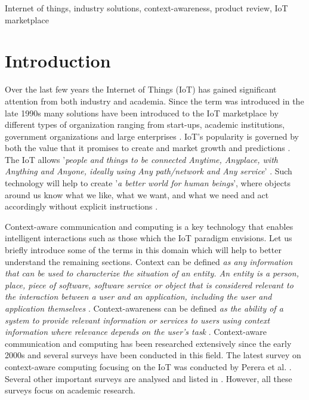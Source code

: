 \documentclass[journal]{IEEEtran}
\begin{document}
\begin{IEEEkeywords}
Internet of things, industry solutions, context-awareness, product review, IoT marketplace
\end{IEEEkeywords}









\section{Introduction}
\label{sec:Introduction}

Over the last few years the Internet of Things (IoT) \cite{P003} has gained significant attention from both industry and academia. Since the term was introduced in the late 1990s many solutions have been introduced to the IoT marketplace by different types of organization ranging from start-ups, academic institutions, government organizations and large enterprises \cite{ZMP007}. IoT's popularity is governed by both the value that it promises to create and market growth and predictions \cite{ZMP003}. The IoT allows '\textit{people and things to be connected Anytime, Anyplace, with Anything and Anyone, ideally using Any path/network and Any service}' \cite{P029}. Such technology will help to create '\textit{a better world for human beings}', where objects around us know what we like, what we want, and what we need and act accordingly without explicit instructions \cite{ZMP007}. 

Context-aware communication and computing is a key technology that enables intelligent interactions such as those which the IoT paradigm envisions. Let us briefly introduce some of the terms in this domain which will help to  better understand the remaining sections. Context can be defined \textit{as any information that can be used to characterize the situation of an entity. An entity is a person, place, piece of software, software service or object that is considered relevant to the interaction between a user and an application, including the user and application themselves} \cite{P104}. Context-awareness can be defined \textit{as the ability of a system to provide relevant information or services to users using context information where relevance depends on the user's task} \cite{P104}. Context-aware communication and computing has been researched extensively since the early 2000s and several surveys have been conducted in this field. The latest survey on context-aware computing focusing on the IoT was conducted by Perera et al. \cite{ZMP007}. Several other important surveys are analysed and listed in \cite{ZMP007}. However, all these surveys focus on academic research.
\end{document}

